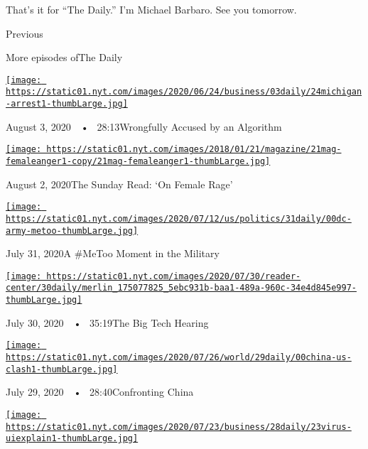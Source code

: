That's it for ``The Daily.'' I'm Michael Barbaro. See you tomorrow.

Previous

More episodes ofThe Daily

\href{https://www.nytimes.com/2020/08/03/podcasts/the-daily/algorithmic-justice-racism.html?action=click\&module=audio-series-bar\&region=header\&pgtype=Article}{\texttt{[image: https://static01.nyt.com/images/2020/06/24/business/03daily/24michigan-arrest1-thumbLarge.jpg]}}

August 3, 2020~~•~ 28:13Wrongfully Accused by an Algorithm

\href{https://www.nytimes.com/2020/08/02/podcasts/the-daily/on-female-rage.html?action=click\&module=audio-series-bar\&region=header\&pgtype=Article}{\texttt{[image: https://static01.nyt.com/images/2018/01/21/magazine/21mag-femaleanger1-copy/21mag-femaleanger1-thumbLarge.jpg]}}

August 2, 2020The Sunday Read: `On Female Rage'

\href{https://www.nytimes.com/2020/07/31/podcasts/the-daily/vanessa-guillen-military-metoo.html?action=click\&module=audio-series-bar\&region=header\&pgtype=Article}{\texttt{[image: https://static01.nyt.com/images/2020/07/12/us/politics/31daily/00dc-army-metoo-thumbLarge.jpg]}}

July 31, 2020A \#MeToo Moment in the Military

\href{https://www.nytimes.com/2020/07/30/podcasts/the-daily/congress-facebook-amazon-google-apple.html?action=click\&module=audio-series-bar\&region=header\&pgtype=Article}{\texttt{[image: https://static01.nyt.com/images/2020/07/30/reader-center/30daily/merlin\_175077825\_5ebc931b-baa1-489a-960c-34e4d845e997-thumbLarge.jpg]}}

July 30, 2020~~•~ 35:19The Big Tech Hearing

\href{https://www.nytimes.com/2020/07/29/podcasts/the-daily/china-trump-foreign-policy.html?action=click\&module=audio-series-bar\&region=header\&pgtype=Article}{\texttt{[image: https://static01.nyt.com/images/2020/07/26/world/29daily/00china-us-clash1-thumbLarge.jpg]}}

July 29, 2020~~•~ 28:40Confronting China

\href{https://www.nytimes.com/2020/07/28/podcasts/the-daily/unemployment-benefits-coronavirus.html?action=click\&module=audio-series-bar\&region=header\&pgtype=Article}{\texttt{[image: https://static01.nyt.com/images/2020/07/23/business/28daily/23virus-uiexplain1-thumbLarge.jpg]}}


